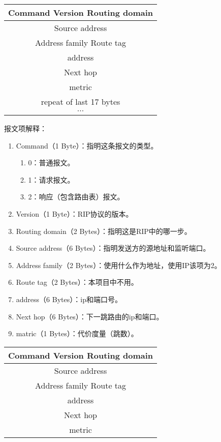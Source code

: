 \begin{table}[H]
	\centering
	\begin{tabular}{|c|}
		\hline
		Command \; \vline \; Version \; \vline \; Routing domain \; \\
		\hline
		Source address \\
		\hline
		Address family \; \vline \; Route tag \; \\
		\hline
		address \\
		\hline
		Next hop \\
		\hline
		metric \\
		\hline
		repeat of last 17 bytes \\
		\hline
		$\cdots$ \\
		\hline 
	\end{tabular}	
\end{table}
报文项解释：
\begin{enumerate}
	\item Command（1 Byte）：指明这条报文的类型。
	\begin{enumerate}[]
		\item 0：普通报文。
		\item 1：请求报文。
		\item 2：响应（包含路由表）报文。
	\end{enumerate}
	\item Version（1 Byte）：RIP协议的版本。
	\item Routing domain（2 Bytes）：指明这是RIP中的哪一步。
	\item Source address（6 Bytes）：指明发送方的源地址和监听端口。
	\item Address family（2 Bytes）：使用什么作为地址，使用IP该项为2。
	\item Route tag（2 Bytes）：本项目中不用。
	\item address（6 Bytes）：ip和端口号。
	\item Next hop（6 Bytes）：下一跳路由的ip和端口。
	\item matric（1 Bytes）：代价度量（跳数）。
\end{enumerate}
\begin{table}[H]
	\centering
	\begin{tabular}{|c|}
		\hline
		Command \; \vline \; Version \; \vline \; Routing domain \; \\
		\hline
		Source address \\
		\hline
		Address family \; \vline \; Route tag \; \\
		\hline
		address \\
		\hline
		Next hop \\
		\hline
		metric \\
		\hline
	\end{tabular}
\end{table}
